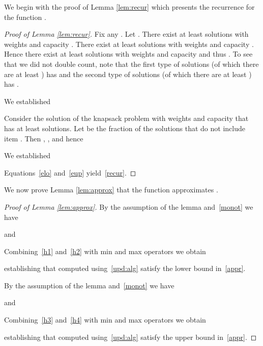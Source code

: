 \documentclass[11pt]{article}
\begin{document}
We begin with the proof of Lemma \ref{lem:recur} which presents the
recurrence for the function .

\begin{proof}[Proof of Lemma \ref{lem:recur}]
Fix any . Let . There exist at least
 solutions with weights  and capacity
. There exist at least 
solutions with weights  and capacity . Hence there exist at least 
solutions with weights  and capacity  and thus
. To see that we did not double count, note
that the first type of solutions (of which
there are at least ) has  and the second type of
solutions (of which there are at least ) has .

We established


Consider the solution of the knapsack problem with weights  and capacity 
that has at least  solutions. Let  be the fraction of the solutions that do
not include item . Then , , and
hence

We established

Equations~\eqref{elo} and~\eqref{eup} yield~\eqref{recur}.
\end{proof}

We now prove Lemma \ref{lem:approx} that the function  approximates .
\begin{proof}[Proof of Lemma \ref{lem:approx}]
By the assumption of the lemma and~\eqref{monot} we have

and

Combining~\eqref{h1} and~\eqref{h2} with min and max operators we obtain

establishing that  computed using~\eqref{upd:alg} satisfy the lower bound in~\eqref{appr}.

By the assumption of the lemma and~\eqref{monot} we have

and

Combining~\eqref{h3} and~\eqref{h4} with min and max operators we obtain

establishing that  computed using~\eqref{upd:alg} satisfy the upper bound in~\eqref{appr}.
\end{proof}











\end{document}
